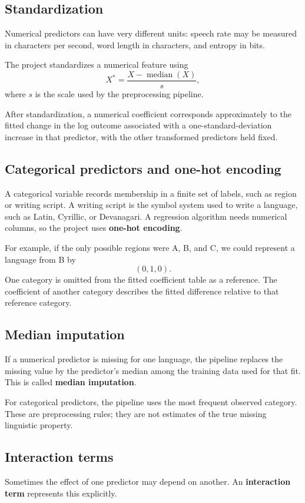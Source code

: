 \documentclass[11pt]{article}
\begin{document}
\subsection{Standardization}
Numerical predictors can have very different units: speech rate may be measured in characters per second, word length in characters, and entropy in bits.

The project standardizes a numerical feature using
\[
X^*=\frac{X-\operatorname{median}(X)}{s},
\]
where $s$ is the scale used by the preprocessing pipeline.

After standardization, a numerical coefficient corresponds approximately to the fitted change in the log outcome associated with a one-standard-deviation increase in that predictor, with the other transformed predictors held fixed.

\subsection{Categorical predictors and one-hot encoding}
A categorical variable records membership in a finite set of labels, such as region or writing script. A writing script is the symbol system used to write a language, such as Latin, Cyrillic, or Devanagari. A regression algorithm needs numerical columns, so the project uses \textbf{one-hot encoding}.

For example, if the only possible regions were A, B, and C, we could represent a language from B by
\[
(0,1,0).
\]
One category is omitted from the fitted coefficient table as a reference. The coefficient of another category describes the fitted difference relative to that reference category.

\subsection{Median imputation}
If a numerical predictor is missing for one language, the pipeline replaces the missing value by the predictor's median among the training data used for that fit. This is called \textbf{median imputation}.

For categorical predictors, the pipeline uses the most frequent observed category. These are preprocessing rules; they are not estimates of the true missing linguistic property.

\subsection{Interaction terms}
Sometimes the effect of one predictor may depend on another. An \textbf{interaction term} represents this explicitly.
\end{document}
